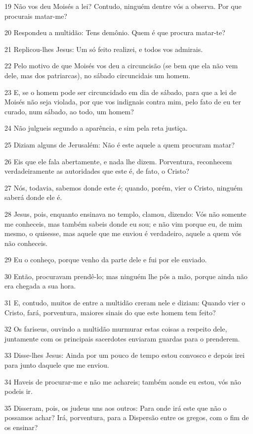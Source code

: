 \par 19 Não vos deu Moisés a lei? Contudo, ninguém dentre vós a observa. Por que procurais matar-me?
\par 20 Respondeu a multidão: Tens demônio. Quem é que procura matar-te?
\par 21 Replicou-lhes Jesus: Um só feito realizei, e todos vos admirais.
\par 22 Pelo motivo de que Moisés vos deu a circuncisão (se bem que ela não vem dele, mas dos patriarcas), no sábado circuncidais um homem.
\par 23 E, se o homem pode ser circuncidado em dia de sábado, para que a lei de Moisés não seja violada, por que vos indignais contra mim, pelo fato de eu ter curado, num sábado, ao todo, um homem?
\par 24 Não julgueis segundo a aparência, e sim pela reta justiça.
\par 25 Diziam alguns de Jerusalém: Não é este aquele a quem procuram matar?
\par 26 Eis que ele fala abertamente, e nada lhe dizem. Porventura, reconhecem verdadeiramente as autoridades que este é, de fato, o Cristo?
\par 27 Nós, todavia, sabemos donde este é; quando, porém, vier o Cristo, ninguém saberá donde ele é.
\par 28 Jesus, pois, enquanto ensinava no templo, clamou, dizendo: Vós não somente me conheceis, mas também sabeis donde eu sou; e não vim porque eu, de mim mesmo, o quisesse, mas aquele que me enviou é verdadeiro, aquele a quem vós não conheceis.
\par 29 Eu o conheço, porque venho da parte dele e fui por ele enviado.
\par 30 Então, procuravam prendê-lo; mas ninguém lhe pôs a mão, porque ainda não era chegada a sua hora.
\par 31 E, contudo, muitos de entre a multidão creram nele e diziam: Quando vier o Cristo, fará, porventura, maiores sinais do que este homem tem feito?
\par 32 Os fariseus, ouvindo a multidão murmurar estas coisas a respeito dele, juntamente com os principais sacerdotes enviaram guardas para o prenderem.
\par 33 Disse-lhes Jesus: Ainda por um pouco de tempo estou convosco e depois irei para junto daquele que me enviou.
\par 34 Haveis de procurar-me e não me achareis; também aonde eu estou, vós não podeis ir.
\par 35 Disseram, pois, os judeus uns aos outros: Para onde irá este que não o possamos achar? Irá, porventura, para a Dispersão entre os gregos, com o fim de os ensinar?
